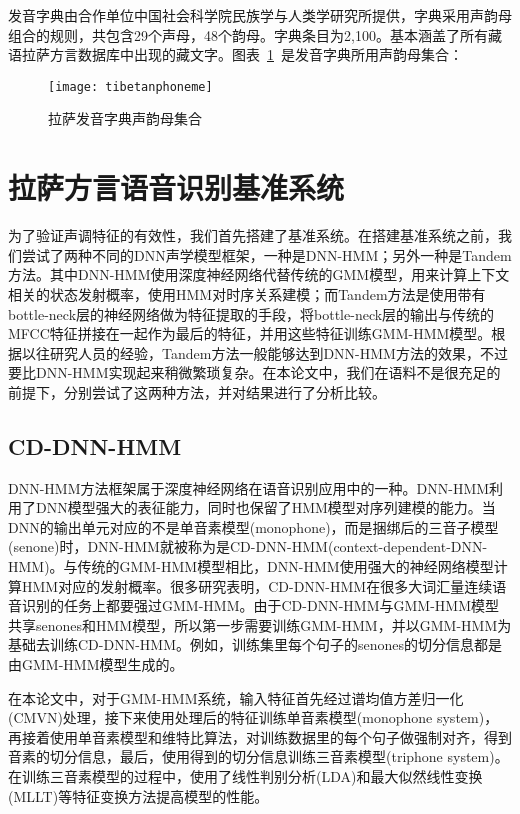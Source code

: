 发音字典由合作单位中国社会科学院民族学与人类学研究所提供，字典采用声韵母组合的规则，共包含29个声母，48个韵母。字典条目为2,100。基本涵盖了所有藏语拉萨方言数据库中出现的藏文字。图表~\ref{fig:tibetanphoneme}~是发音字典所用声韵母集合：
\begin{figure}[htbp]
\centering
\texttt{[image: tibetanphoneme]}
\caption{拉萨发音字典声韵母集合}\label{fig:tibetanphoneme}
\vspace{\baselineskip}
\end{figure}

\section{拉萨方言语音识别基准系统}
为了验证声调特征的有效性，我们首先搭建了基准系统。在搭建基准系统之前，我们尝试了两种不同的DNN声学模型框架，一种是DNN-HMM\cite{dahl2012context}；另外一种是Tandem方法\cite{hermansky2000tandem}。其中DNN-HMM使用深度神经网络代替传统的GMM模型，用来计算上下文相关的状态发射概率，使用HMM对时序关系建模；而Tandem方法是使用带有bottle-neck层的神经网络做为特征提取的手段，将bottle-neck层的输出与传统的MFCC特征拼接在一起作为最后的特征，并用这些特征训练GMM-HMM模型。根据以往研究人员的经验，Tandem方法一般能够达到DNN-HMM方法的效果，不过要比DNN-HMM实现起来稍微繁琐复杂。在本论文中，我们在语料不是很充足的前提下，分别尝试了这两种方法，并对结果进行了分析比较。
\subsection{CD-DNN-HMM}
DNN-HMM方法框架属于深度神经网络在语音识别应用中的一种。DNN-HMM利用了DNN模型强大的表征能力，同时也保留了HMM模型对序列建模的能力。当DNN的输出单元对应的不是单音素模型(monophone)，而是捆绑后的三音子模型(senone)时，DNN-HMM就被称为是CD-DNN-HMM(context-dependent-DNN-HMM)。与传统的GMM-HMM模型相比，DNN-HMM使用强大的神经网络模型计算HMM对应的发射概率。很多研究表明，CD-DNN-HMM在很多大词汇量连续语音识别的任务上都要强过GMM-HMM。由于CD-DNN-HMM与GMM-HMM模型共享senones和HMM模型，所以第一步需要训练GMM-HMM，并以GMM-HMM为基础去训练CD-DNN-HMM。例如，训练集里每个句子的senones的切分信息都是由GMM-HMM模型生成的。

在本论文中，对于GMM-HMM系统，输入特征首先经过谱均值方差归一化(CMVN)处理，接下来使用处理后的特征训练单音素模型(monophone system)，再接着使用单音素模型和维特比算法，对训练数据里的每个句子做强制对齐，得到音素的切分信息，最后，使用得到的切分信息训练三音素模型(triphone system)。在训练三音素模型的过程中，使用了线性判别分析(LDA)和最大似然线性变换(MLLT)等特征变换方法提高模型的性能。

